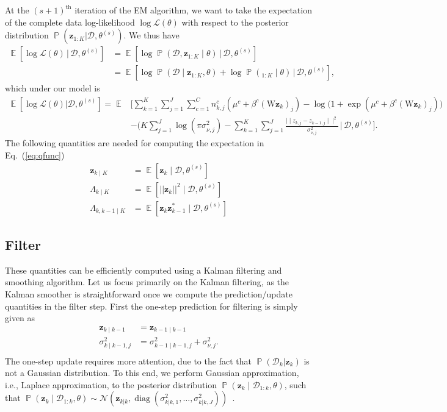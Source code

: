 \documentclass{article}
\DeclareMathOperator{\E}{\mathbb{E}}
\DeclareMathOperator{\Pp}{\mathbb{P}}
\newcommand{\data}{\mathcal{D}}
\def\*#1{\mathbf{#1}}
\begin{document}
At the $(s+1)^{\text{th}}$ iteration of the EM algorithm, we want to take the
expectation of the complete data log-likelihood $\log \mathcal{L}(\theta)$ with
respect to the posterior distribution $\Pp(\*z_{1:K}|\data,\theta^{(s)})$. We
thus have
\begin{align}
   \E [\log \mathcal{L}(\theta)\,|\,\data,\theta^{(s)}] &= \E [\log \Pp(\data, \*z_{1:K} \mid \theta)\,|\,\data,\theta^{(s)}] \nonumber \\
   &= \E [\log \Pp (\data \mid \*z_{1:K}, \theta) + \log \Pp(_{1:K} \mid \theta)\,|\,\data,\theta^{(s)} ], \nonumber
\end{align}
which under our model is
\begin{align}\label{eq:qfunc}
   \E [\log \mathcal{L}(\theta)|\data,\theta^{(s)}]=\E & \Bigg[ \sum_{k=1}^K \sum_{j=1}^J \sum_{c=1}^C n_{k,j}^c (\mu^c + \beta^c (\text{W}\*z_k)_j) 
      - \log \big(1 + \exp( \mu^c + \beta^c (\text{W} \*z_k)_j ) \big) \nonumber \\  
   & -(K\sum_{j=1}^J\log(\pi \sigma^2_{\nu,j}) - \sum_{k=1}^K \sum_{j=1}^J \frac{\mid \mid z_{k,j}  - 
      z_{k-1,j}  \mid \mid^2}{\sigma_{\nu, j}^2} \,\Big|\,\data,\theta^{(s)}\Bigg].
\end{align}
The following quantities are needed for computing the expectation in
Eq.~(\ref{eq:qfunc})
\begin{equation}\label{eq:exps}
   \begin{split}
   \*z_{k \mid K}  &= \E [ \*z_k \mid 
      \data, \theta^{(s)}] \\
   \Lambda_{k \mid K} &= \E [ || \*z_k ||^2 
      \mid \data, \theta^{{(s)}}] \\
   \Lambda_{k, k-1 \mid K} &= \E [ \*z_k \*z^*_{k-1}  
      \mid \data, \theta^{{(s)}}]
   \end{split}
\end{equation}
\subsection{Filter}
These quantities can be efficiently computed using a Kalman filtering and
smoothing algorithm. Let us focus primarily on the Kalman filtering, as the
Kalman smoother is straightforward once we compute the prediction/update
quantities in the filter step. First the one-step prediction for filtering is
simply given as
\begin{equation}
    \begin{split}
    \*z_{k \mid k-1} &= \*z_{k-1 \mid k-1}  \\
   \sigma^2_{k \mid k-1,j} &= \sigma^2_{k-1 \mid k-1, j} + \sigma^2_{\nu, j}. \\
   \end{split}
\end{equation}
The one-step update requires more attention, due to the fact that $\Pp
(\data_k|\*z_k)$ is not a Gaussian distribution. To this end, we perform
Gaussian approximation, i.e., Laplace approximation, to the posterior
distribution $\Pp (\*z_k \mid \data_{1:k},\theta)$, such that $\Pp (\*z_k \mid
\data_{1:k},\theta)\sim
\mathcal{N}(\*z_{k|k},\operatorname{diag}(\sigma_{k|k,1}^2,\ldots,\sigma_{k|k,J}^2))$~\cite{Smith03}.\\
\end{document}
